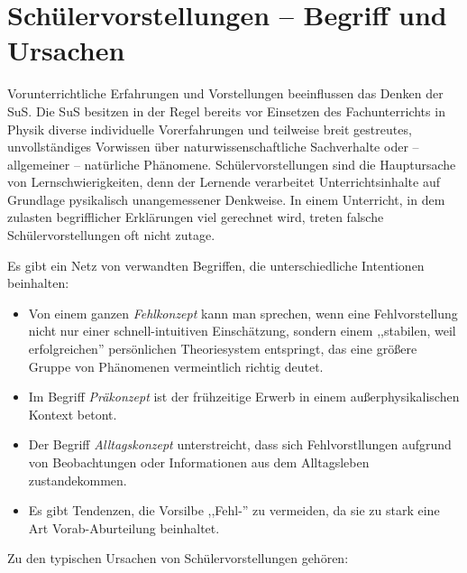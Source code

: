 \bip\bip
\section{Sch{\"u}lervorstellungen --  Begriff und Ursachen}
Vorunterrichtliche Erfahrungen und Vorstellungen beeinflussen das Denken der SuS. Die SuS besitzen in der Regel bereits vor Einsetzen des Fachunterrichts in Physik diverse individuelle Vorerfahrungen und teilweise breit gestreutes, unvollst{\"a}ndiges Vorwissen {\"u}ber naturwissenschaftliche Sachverhalte oder -- allgemeiner -- nat{\"u}rliche Ph{\"a}nomene. Sch{\"u}lervorstellungen sind die Hauptursache von Lernschwierigkeiten, denn der Lernende verarbeitet Unterrichtsinhalte auf Grundlage pysikalisch unangemessener Denkweise. In einem Unterricht, in dem zulasten begrifflicher Erkl{\"a}rungen viel gerechnet wird, treten falsche Sch{\"u}lervorstellungen oft nicht zutage. 

Es gibt ein Netz von verwandten Begriffen, die unterschiedliche Intentionen beinhalten:

\begin{itemize}
\item Von einem ganzen \emph{Fehlkonzept} kann man sprechen, wenn eine Fehlvorstellung nicht nur einer
schnell-intuitiven Einsch\"{a}tzung, sondern einem ,,stabilen, weil erfolgreichen'' pers\"{o}nlichen
Theoriesystem entspringt, das eine gr\"{o}{\ss}ere Gruppe von Ph\"{a}nomenen vermeintlich richtig deutet.
\item
Im Begriff \emph{Pr\"{a}konzept} ist der fr\"{u}hzeitige Erwerb in einem au{\ss}erphysikalischen Kontext betont.
\item
Der Begriff \emph{Alltagskonzept} unterstreicht, dass sich Fehlvorstllungen aufgrund von Beobachtungen
oder Informationen aus dem Alltagsleben zustandekommen.
\item
Es gibt Tendenzen, die Vorsilbe ,,Fehl-'' zu vermeiden, da sie zu stark eine Art Vorab-Aburteilung beinhaltet.
\end{itemize}

\bip


Zu den typischen Ursachen von Sch{\"u}lervorstellungen geh{\"o}ren:

